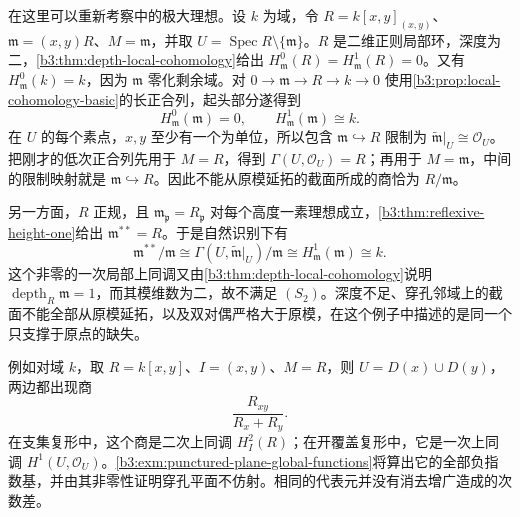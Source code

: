 \ProseParagraphBreak
在这里可以重新考察中的极大理想。设 \(k\) 为域，令 \(R=k[x,y]_{(x,y)}\)、\(\mathfrak m=(x,y)R\)、\(M=\mathfrak m\)，并取 \(U=\operatorname{Spec}R\setminus\{\mathfrak m\}\)。\(R\) 是二维正则局部环，深度为二，\cref{b3:thm:depth-local-cohomology}给出 \(H_{\mathfrak m}^0(R)=H_{\mathfrak m}^1(R)=0\)。又有 \(H_{\mathfrak m}^0(k)=k\)，因为 \(\mathfrak m\) 零化剩余域。对 \(0\to\mathfrak m\to R\to k\to0\) 使用\cref{b3:prop:local-cohomology-basic}的长正合列，起头部分遂得到
\[
	H_{\mathfrak m}^0(\mathfrak m)=0,\qquad H_{\mathfrak m}^1(\mathfrak m)\cong k.
\]
在 \(U\) 的每个素点，\(x,y\) 至少有一个为单位，所以包含 \(\mathfrak m\hookrightarrow R\) 限制为 \(\widetilde{\mathfrak m}|_U\cong\mathcal O_U\)。把刚才的低次正合列先用于 \(M=R\)，得到 \(\Gamma(U,\mathcal O_U)=R\)；再用于 \(M=\mathfrak m\)，中间的限制映射就是 \(\mathfrak m\hookrightarrow R\)。因此不能从原模延拓的截面所成的商恰为 \(R/\mathfrak m\)。

\ProseParagraphBreak
另一方面，\(R\) 正规，且 \(\mathfrak m_{\mathfrak p}=R_{\mathfrak p}\) 对每个高度一素理想成立，\cref{b3:thm:reflexive-height-one}给出 \(\mathfrak m^{**}=R\)。于是自然识别下有
\[
	\mathfrak m^{**}/\mathfrak m \cong\Gamma(U,\widetilde{\mathfrak m}|_U)/\mathfrak m \cong H_{\mathfrak m}^1(\mathfrak m) \cong k.
\]
这个非零的一次局部上同调又由\cref{b3:thm:depth-local-cohomology}说明 \(\operatorname{depth}_R\mathfrak m=1\)，而其模维数为二，故不满足 \((S_2)\)。深度不足、穿孔邻域上的截面不能全部从原模延拓，以及双对偶严格大于原模，在这个例子中描述的是同一个只支撑于原点的缺失。

\ProseParagraphBreak
例如对域 \(k\)，取 \(R=k[x,y]\)、\(I=(x,y)\)、\(M=R\)，则 \(U=D(x)\cup D(y)\)，两边都出现商
\[
	\frac{R_{xy}}{R_x+R_y}.
\]
在支集复形中，这个商是二次上同调 \(H_I^2(R)\)；在开覆盖复形中，它是一次上同调 \(H^1(U,\mathcal O_U)\)。\cref{b3:exm:punctured-plane-global-functions}将算出它的全部负指数基，并由其非零性证明穿孔平面不仿射。相同的代表元并没有消去增广造成的次数差。

